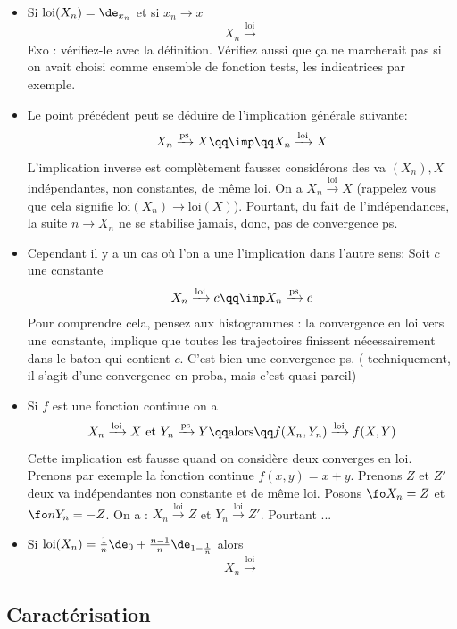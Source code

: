 \documentclass{article}
\def\loi{\text{loi}}
\begin{document}
\begin{itemize}

\item Si $\text{loi}(X_n) = \de_{x_n}$ et si $x_n \to x$
$$
X_n   \xrightarrow{\text{loi}}     
$$
Exo : vérifiez-le avec la définition. Vérifiez aussi que ça ne marcherait pas si on avait choisi comme ensemble de fonction tests, les indicatrices par exemple. 

\item Le point précédent peut se déduire de l'implication générale suivante:
$$
X_n   \xrightarrow{\text{ps}}  X  \qq \imp \qq       X_n   \xrightarrow{\text{loi}}  X
$$
L'implication inverse est complètement fausse: considérons des va $(X_n),X$  indépendantes, non constantes,  de même loi.  On a  $ X_n   \xrightarrow{\text{loi}}  X$ (rappelez vous que cela signifie $\loi(X_n) \to \loi(X)$).  Pourtant, du fait de l'indépendances, la suite $n\to X_n$ ne se stabilise jamais, donc, pas de convergence ps.  
\item Cependant il y a un cas où l'on a une l'implication dans l'autre sens: Soit $c$ une constante
$$
X_n   \xrightarrow{\text{loi}}  c  \qq \imp X_n   \xrightarrow{\text{ps}}  c
$$ 
 Pour comprendre cela, pensez aux histogrammes : la convergence en loi vers une constante, implique que toutes les trajectoires finissent nécessairement dans le baton qui contient $c$. C'est   bien une convergence ps.   {\tiny ( techniquement, il s'agit d'une convergence en proba, mais c'est quasi pareil)}
 \item Si $f$ est une fonction continue on a
$$
X_n  \xrightarrow{\text{loi}}  X \text{ et }  Y_n \xrightarrow{\text{ps}}  Y   \qq \mathrm{ alors } \qq  f(X_n,Y_n) \xrightarrow{\text{loi}} f(X,Y)
$$
Cette implication est fausse quand on considère deux converges en loi. Prenons par exemple la fonction continue $f(x,y) = x+y$.  Prenons $Z$ et $Z'$ deux va indépendantes non constante et de même loi. Posons $\fo X_n = Z$ et $\fo n  Y_n = - Z $.  On a : $X_n \xrightarrow{\text{loi}} Z$ et  $Y_n \xrightarrow{\text{loi}} Z'$. Pourtant ...  

\item Si $\loi(X_n) = \frac 1n \de_0 +  \frac  {n-1}{n} \de_{1-\frac 1 n}$ alors
$$
X_n  \xrightarrow{\text{loi}}
$$
\end{itemize}

\subsection{Caractérisation}
\end{document}

